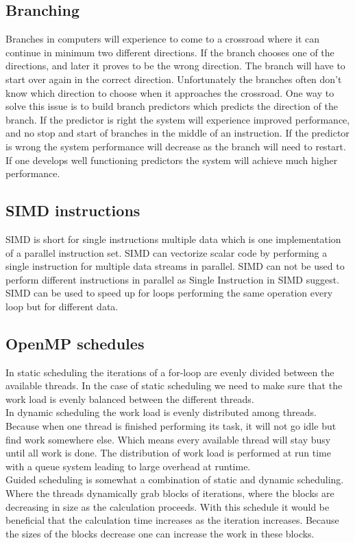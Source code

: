 \documentclass[12pt]{article}
\begin{document}
\subsection{Branching}
Branches in computers will experience to come to a crossroad where it can continue in minimum two different directions. If the branch chooses one of the directions, and later it proves to be the wrong direction. The branch will have to start over again in the correct direction. Unfortunately the branches often don't know which direction to choose when it approaches the crossroad. One way to solve this issue is to build branch predictors which predicts the direction of the branch. If the predictor is right the system will experience improved performance, and no stop and start of branches in the middle of an instruction. If the predictor is wrong the system performance will decrease as the branch will need to restart. If one develops well functioning predictors the system will achieve much higher performance.
\subsection{SIMD instructions}
SIMD is short for single instructions multiple data which is one implementation of a parallel instruction set. SIMD can vectorize scalar code by performing a single instruction for multiple data streams in parallel. SIMD can not be used to perform different instructions in parallel as Single Instruction in SIMD suggest. SIMD can be used to speed up for loops performing the same operation every loop but for different data.
\subsection{OpenMP schedules}
In static scheduling the iterations of a for-loop are evenly divided between the available threads. In the case of static scheduling we need to make sure that the work load is evenly balanced between the different threads. 
\\[10pt]
In dynamic scheduling the work load is evenly distributed among threads. Because when one thread is finished performing its task, it will not go idle but find work somewhere else. Which means every available thread will stay busy until all work is done. The distribution of work load is performed at run time with a queue system leading to large overhead at runtime. 
\\[10pt]
Guided scheduling is somewhat a combination of static and dynamic scheduling. Where the threads dynamically grab blocks of iterations, where the blocks are decreasing in size as the calculation proceeds. With this schedule it would be beneficial that the calculation time increases as the iteration increases. Because the sizes of the blocks decrease one can increase the work in these blocks.
\end{document}
